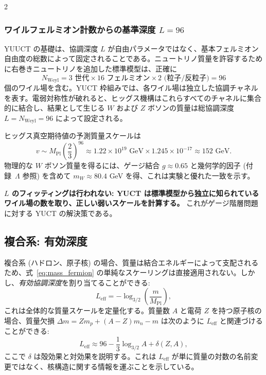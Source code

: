 \documentclass[11pt,a4paper]{article}
\theoremstyle{remark}
\begin{document}
\begin{multicols}{2}
		\subsubsection{ワイルフェルミオン計数からの基準深度 $L=96$}
		
		YUUCT の基礎は、協調深度 $L$ が自由パラメータではなく、基本フェルミオン自由度の総数によって固定されることである。ニュートリノ質量を許容するために右巻きニュートリノを追加した標準模型は、正確に
		\scriptsize
		\[
		N_{\text{Weyl}} = 3 \text{ 世代} \times 16 \text{ フェルミオン} \times 2 \text{ (粒子/反粒子)} = 96
		\]
		\small
		個のワイル場を含む。YUCT 枠組みでは、各ワイル場は独立した協調チャネルを表す。電弱対称性が破れると、ヒッグス機構はこれらすべてのチャネルに集合的に結合し、結果として生じる $W$ および $Z$ ボソンの質量は総協調深度 $L = N_{\text{Weyl}} = 96$ によって設定される。
		
		ヒッグス真空期待値の予測質量スケールは
		\begin{equation}
			v \sim M_{\mathrm{Pl}} \left( \frac{2}{3} \right)^{96} \approx 1.22 \times 10^{19} \text{ GeV} \times 1.245\times10^{-17} \approx 152 \text{ GeV}.
		\end{equation}
		物理的な $W$ ボソン質量を得るには、ゲージ結合 $g \approx 0.65$ と幾何学的因子 (付録~$\Lambda$ 参照) を含めて $m_W \approx 80.4$ GeV を得、これは実験と優れた一致を示す。
		
		\textbf{$L$ のフィッティングは行われない: YUCT は標準模型から独立に知られているワイル場の数を取り、正しい弱いスケールを計算する。} これがゲージ階層問題に対する YUCT の解決策である。
		
		\subsection{複合系: 有効深度}
		
		複合系 (ハドロン、原子核) の場合、質量は結合エネルギーによって支配されるため、式~\eqref{eq:mass_fermion} の単純なスケーリングは直接適用されない。しかし、\emph{有効協調深度}を割り当てることができる:
		\begin{equation}
			L_{\mathrm{eff}} = -\log_{3/2}\left( \frac{m}{M_{\mathrm{Pl}}} \right),
			\label{eq:Leff}
		\end{equation}
		これは全体的な質量スケールを定量化する。質量数 \(A\) と電荷 \(Z\) を持つ原子核の場合、質量欠損 \(\Delta m = Z m_p + (A-Z) m_n - m\) は次のように \(L_{\mathrm{eff}}\) と関連づけることができる:
		\begin{equation}
			L_{\mathrm{eff}} \approx 96 - \frac{1}{3} \log_{3/2} A + \delta(Z,A),
		\end{equation}
		ここで \(\delta\) は殻効果と対効果を説明する。これは \(L_{\mathrm{eff}}\) が単に質量の対数の名前変更ではなく、核構造に関する情報を運ぶことを示している。
		
	\end{multicols}
	
\end{document}
